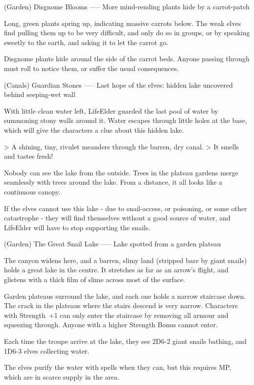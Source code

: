 (Garden) Disgnome Blooms
-----
{More mind-rending plants hide by a carrot-patch}

Long, green plants spring up, indicating massive carrots below.
The weak elves find pulling them up to be very difficult, and only do so in groups, or by speaking sweetly to the earth, and asking it to let the carrot go.

Disgnome plants hide around the side of the carrot beds.
Anyone passing through must roll to notice them, or suffer the usual consequences.

(Canals) Guardian Stones
-----
{Last hope of the elves: hidden lake uncovered behind seeping-wet wall}

With little clean water left, LifeElder guarded the last pool of water by summoning stony walls around it.
Water escapes through little holes at the base, which will give the characters a clue about this hidden lake.

> A shining, tiny, rivulet meanders through the barren, dry canal.
> It smells and tastes fresh!

Nobody can see the lake from the outside.
Trees in the plateau gardens merge seamlessly with trees around the lake.
From a distance, it all looks like a continuous canopy.

If the elves cannot use this lake - due to snail-access, or poisoning, or some other catastrophe - they will find themselves without a good source of water, and LifeElder will have to stop supporting the snails.

(Garden) The Great Snail Lake
-----
{Lake spotted from a garden plateau}

The canyon widens here, and a barren, slimy land (stripped bare by giant snails) holds a great lake in the centre.
It stretches as far as an arrow's flight, and glistens with a thick film of slime across most of the surface.

Garden plateaus surround the lake, and each one holds a narrow staircase down.
The crack in the plateaus where the stairs descend is very narrow.
Characters with Strength~+1 can only enter the staircase by removing all armour and squeezing through.
Anyone with a higher Strength Bonus cannot enter.

Each time the troupe arrive at the lake,
they see 2D6-2 giant snails bathing, and 1D6-3 elves collecting water.

The elves purify the water with spells when they can, but this requires MP, which are in scarce supply in the area.

